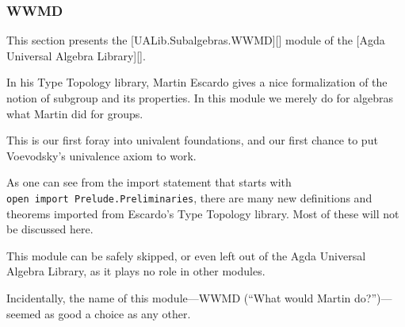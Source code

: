 \subsubsection{WWMD}\label{wwmd}

This section presents the {[}UALib.Subalgebras.WWMD{]}{[}{]} module of
the {[}Agda Universal Algebra Library{]}{[}{]}.

In his Type Topology library, Martin Escardo gives a nice formalization
of the notion of subgroup and its properties. In this module we merely
do for algebras what Martin did for groups.

This is our first foray into univalent foundations, and our first chance
to put Voevodsky's univalence axiom to work.

As one can see from the import statement that starts with
\texttt{open\ import\ Prelude.Preliminaries}, there are many new
definitions and theorems imported from Escardo's Type Topology library.
Most of these will not be discussed here.

This module can be safely skipped, or even left out of the Agda
Universal Algebra Library, as it plays no role in other modules.

Incidentally, the name of this module---WWMD (``What would Martin
do?'')---seemed as good a choice as any other.

